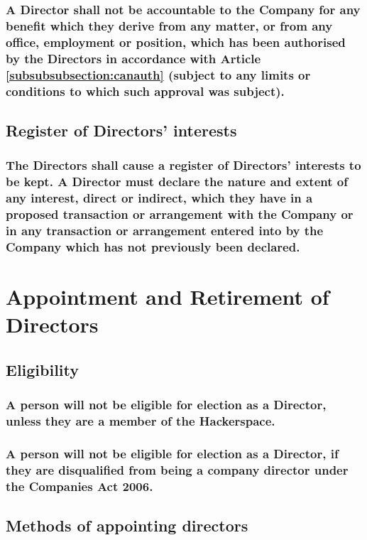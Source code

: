 \documentclass[12pt]{article}
\begin{document}
\subsubsection{A Director shall not be accountable to the Company for any benefit which they derive from any matter, or from any office, employment or position, which has been authorised by the Directors in accordance with Article \ref{subsubsubsection:canauth} (subject to any limits or conditions to which such approval was subject).}

\subsection{Register of Directors’ interests}
\subsubsection{The Directors shall cause a register of Directors’ interests to be kept. A Director must declare the nature and extent of any interest, direct or indirect, which they have in a proposed transaction or arrangement with the Company or in any transaction or arrangement entered into by the Company which has not previously been declared.}

\section*{Appointment and Retirement of Directors}

\subsection{Eligibility}
\subsubsection{A person will not be eligible for election as a Director, unless they are a member of the Hackerspace.}
\subsubsection{\label{subsection:caDisqualified}A person will not be eligible for election as a Director, if they are disqualified from being a company director under the Companies Act 2006.}

\subsection{Methods of appointing directors}
\end{document}
